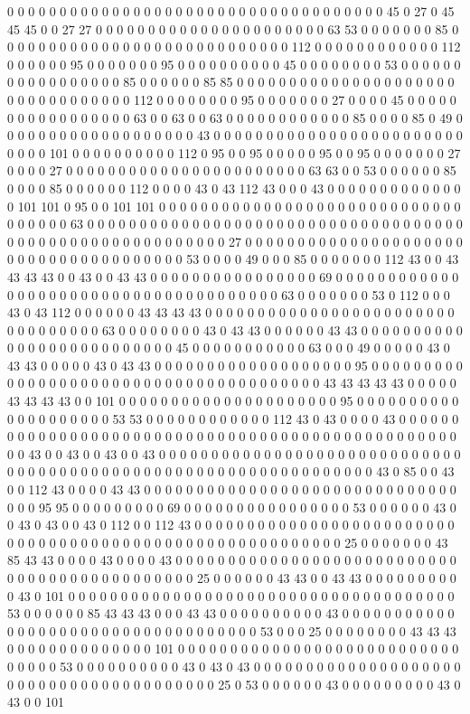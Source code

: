 0 0 0 0 0 0 0 0 0 0 0 0 0 0 0 0 0 0 0 0 0 0 0 0 0 0 0 0 0 0 0 0 0 0 0 0 45 0 27 0 45 45 45 0 0 27 27 0 0 0 0 0 0 0 0 0 0 0 0 0 0 0 0 0 0 0 0 0 0 63 53 0 0 0 0 0 0 0 85 0 0 0 0 0 0 0 0 0 0 0 0 0 0 0 0 0 0 0 0 0 0 0 0 0 0 0 0 112 0 0 0 0 0 0 0 0 0 0 0 0 112 0 0 0 0 0 0 95 0 0 0 0 0 0 0 95 0 0 0 0 0 0 0 0 0 0 45 0 0 0 0 0 0 0 0 53 0 0 0 0 0 0 0 0 0 0 0 0 0 0 0 0 0 85 0 0 0 0 0 0 85 85 0 0 0 0 0 0 0 0 0 0 0 0 0 0 0 0 0 0 0 0 0 0 0 0 0 0 0 0 0 0 0 0 0 112 0 0 0 0 0 0 0 0 95 0 0 0 0 0 0 0 27 0 0 0 0 45 0 0 0 0 0 0 0 0 0 0 0 0 0 0 0 0 0 63 0 0 63 0 0 63 0 0 0 0 0 0 0 0 0 0 0 0 85 0 0 0 0 85 0 49 0 0 0 0 0 0 0 0 0 0 0 0 0 0 0 0 0 0 0 43 0 0 0 0 0 0 0 0 0 0 0 0 0 0 0 0 0 0 0 0 0 0 0 0 0 0 0 0 101 0 0 0 0 0 0 0 0 0 0 112 0 95 0 0 95 0 0 0 0 0 95 0 0 95 0 0 0 0 0 0 0 27 0 0 0 0 27 0 0 0 0 0 0 0 0 0 0 0 0 0 0 0 0 0 0 0 0 0 0 0 63 63 0 0 53 0 0 0 0 0 0 85 0 0 0 0 85 0 0 0 0 0 0 112 0 0 0 0 43 0 43 112 43 0 0 0 43 0 0 0 0 0 0 0 0 0 0 0 0 0 0 101 101 0 95 0 0 101 101 0 0 0 0 0 0 0 0 0 0 0 0 0 0 0 0 0 0 0 0 0 0 0 0 0 0 0 0 0 0 0 0 0 0 0 63 0 0 0 0 0 0 0 0 0 0 0 0 0 0 0 0 0 0 0 0 0 0 0 0 0 0 0 0 0 0 0 0 0 0 0 0 0 0 0 0 0 0 0 0 0 0 0 0 0 0 0 0 0 0 0 0 0 27 0 0 0 0 0 0 0 0 0 0 0 0 0 0 0 0 0 0 0 0 0 0 0 0 0 0 0 0 0 0 0 0 0 0 0 0 0 0 53 0 0 0 0 49 0 0 0 85 0 0 0 0 0 0 0 112 43 0 0 43 43 43 43 0 0 43 0 0 43 43 0 0 0 0 0 0 0 0 0 0 0 0 0 0 0 0 69 0 0 0 0 0 0 0 0 0 0 0 0 0 0 0 0 0 0 0 0 0 0 0 0 0 0 0 0 0 0 0 0 0 0 0 0 0 0 63 0 0 0 0 0 0 0 53 0 112 0 0 0 43 0 43 112 0 0 0 0 0 0 43 43 43 43 0 0 0 0 0 0 0 0 0 0 0 0 0 0 0 0 0 0 0 0 0 0 0 0 0 0 0 0 0 0 0 0 0 63 0 0 0 0 0 0 0 0 43 0 43 43 0 0 0 0 0 0 43 43 0 0 0 0 0 0 0 0 0 0 0 0 0 0 0 0 0 0 0 0 0 0 0 0 0 0 45 0 0 0 0 0 0 0 0 0 0 0 63 0 0 0 49 0 0 0 0 0 43 0 43 43 0 0 0 0 0 43 0 43 43 0 0 0 0 0 0 0 0 0 0 0 0 0 0 0 0 0 0 0 95 0 0 0 0 0 0 0 0 0 0 0 0 0 0 0 0 0 0 0 0 0 0 0 0 0 0 0 0 0 0 0 0 0 0 0 0 0 0 0 43 43 43 43 43 0 0 0 0 0 43 43 43 43 0 0 101 0 0 0 0 0 0 0 0 0 0 0 0 0 0 0 0 0 0 0 0 0 95 0 0 0 0 0 0 0 0 0 0 0 0 0 0 0 0 0 0 0 0 53 53 0 0 0 0 0 0 0 0 0 0 0 0 112 43 0 43 0 0 0 0 43 0 0 0 0 0 0 0 0 0 0 0 0 0 0 0 0 0 0 0 0 0 0 0 0 0 0 0 0 0 0 0 0 0 0 0 0 0 0 0 0 0 0 0 0 0 0 0 0 0 0 0 43 0 0 43 0 0 43 0 0 43 0 0 0 0 0 0 0 0 0 0 0 0 0 0 0 0 0 0 0 0 0 0 0 0 0 0 0 0 0 0 0 0 0 0 0 0 0 0 0 0 0 0 0 0 0 0 0 0 0 0 0 0 0 0 0 0 0 0 0 0 0 0 0 0 43 0 85 0 0 43 0 0 112 43 0 0 0 0 43 43 0 0 0 0 0 0 0 0 0 0 0 0 0 0 0 0 0 0 0 0 0 0 0 0 0 0 0 0 0 0 0 0 0 95 95 0 0 0 0 0 0 0 0 0 69 0 0 0 0 0 0 0 0 0 0 0 0 0 0 0 0 53 0 0 0 0 0 0 43 0 0 43 0 43 0 0 43 0 112 0 0 112 43 0 0 0 0 0 0 0 0 0 0 0 0 0 0 0 0 0 0 0 0 0 0 0 0 0 0 0 0 0 0 0 0 0 0 0 0 0 0 0 0 0 0 0 0 0 0 0 0 0 0 0 0 0 0 0 0 0 25 0 0 0 0 0 0 0 43 85 43 43 0 0 0 0 43 0 0 0 0 43 0 0 0 0 0 0 0 0 0 0 0 0 0 0 0 0 0 0 0 0 0 0 0 0 0 0 0 0 0 0 0 0 0 0 0 0 0 0 0 0 0 0 0 0 0 25 0 0 0 0 0 0 43 43 0 0 43 43 0 0 0 0 0 0 0 0 0 0 43 0 101 0 0 0 0 0 0 0 0 0 0 0 0 0 0 0 0 0 0 0 0 0 0 0 0 0 0 0 0 0 0 0 0 0 0 0 0 0 53 0 0 0 0 0 0 85 43 43 43 0 0 0 43 43 0 0 0 0 0 0 0 0 0 0 43 0 0 0 0 0 0 0 0 0 0 0 0 0 0 0 0 0 0 0 0 0 0 0 0 0 0 0 0 0 0 0 0 0 0 0 53 0 0 0 25 0 0 0 0 0 0 0 0 43 43 43 0 0 0 0 0 0 0 0 0 0 0 0 0 0 101 0 0 0 0 0 0 0 0 0 0 0 0 0 0 0 0 0 0 0 0 0 0 0 0 0 0 0 0 0 0 0 0 53 0 0 0 0 0 0 0 0 0 0 43 0 43 0 43 0 0 0 0 0 0 0 0 0 0 0 0 0 0 0 0 0 0 0 0 0 0 0 0 0 0 0 0 0 0 0 0 0 0 0 0 0 0 0 0 25 0 53 0 0 0 0 0 0 43 0 0 0 0 0 0 0 0 0 43 0 43 0 0 101 